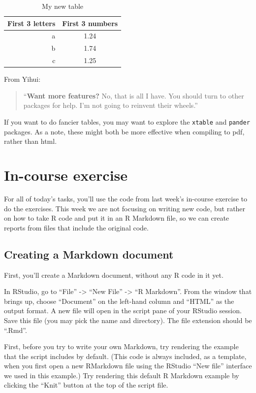 \documentclass[]{book}
\theoremstyle{definition}
\theoremstyle{definition}
\theoremstyle{definition}
\theoremstyle{remark}
\begin{document}
\begin{table}

\caption{\label{tab:unnamed-chunk-320}My new table}
\centering
\begin{tabular}[t]{r|c}
\hline
First 3 letters & First 3 numbers\\
\hline
a & 1.24\\
\hline
b & 1.74\\
\hline
c & 1.25\\
\hline
\end{tabular}
\end{table}

From Yihui:

\begin{quote}
``\textbf{Want more features?} No, that is all I have. You should turn
to other packages for help. I'm not going to reinvent their wheels.''
\end{quote}

If you want to do fancier tables, you may want to explore the
\texttt{xtable} and \texttt{pander} packages. As a note, these might
both be more effective when compiling to pdf, rather than html.

\section{In-course exercise}\label{in-course-exercise-4}

For all of today's tasks, you'll use the code from last week's in-course
exercise to do the exercises. This week we are not focusing on writing
new code, but rather on how to take R code and put it in an R Markdown
file, so we can create reports from files that include the original
code.

\subsection{Creating a Markdown
document}\label{creating-a-markdown-document}

First, you'll create a Markdown document, without any R code in it yet.

In RStudio, go to ``File'' -\textgreater{} ``New File'' -\textgreater{}
``R Markdown''. From the window that brings up, choose ``Document'' on
the left-hand column and ``HTML'' as the output format. A new file will
open in the script pane of your RStudio session. Save this file (you may
pick the name and directory). The file extension should be ``.Rmd''.

First, before you try to write your own Markdown, try rendering the
example that the script includes by default. (This code is always
included, as a template, when you first open a new RMarkdown file using
the RStudio ``New file'' interface we used in this example.) Try
rendering this default R Markdown example by clicking the ``Knit''
button at the top of the script file.
\end{document}

